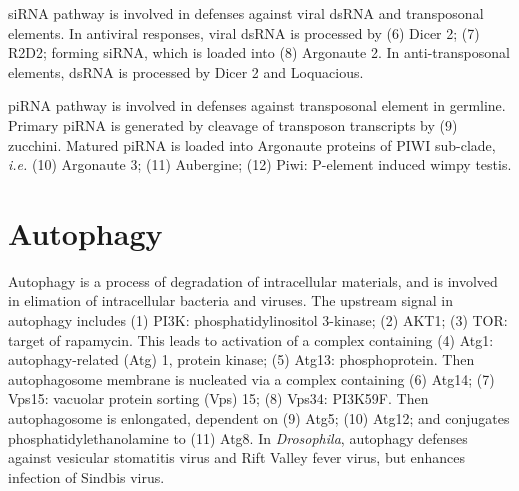 \documentclass[11pt]{article}
\begin{document}
\begin{sloppypar}
\par 

siRNA pathway is involved in defenses against viral dsRNA and transposonal elements. 
In antiviral responses, viral dsRNA is processed by 
\newline
(6) Dicer 2; \newline
(7) R2D2; \newline
forming siRNA, which is loaded into 
(8) Argonaute 2. 
In anti-transposonal elements, 
dsRNA is processed by Dicer 2 and Loquacious. 

\par

piRNA pathway is involved in defenses against transposonal element in germline. 
Primary piRNA is generated by cleavage of transposon transcripts by 
\newline
(9) zucchini. \newline
Matured piRNA is loaded into Argonaute proteins of PIWI sub-clade, \textit{i.e.} 
\newline
(10) Argonaute 3; \newline
(11) Aubergine; \newline
(12) Piwi: P-element induced wimpy testis. 

\section*{Autophagy}
Autophagy is a process of degradation of intracellular materials, and is involved in elimation of intracellular bacteria and viruses. 
The upstream signal in autophagy includes 
\newline
(1) PI3K: phosphatidylinositol 3-kinase; \newline
(2) AKT1; \newline
(3) TOR: target of rapamycin. \newline
This leads to activation of a complex containing 
\newline
(4) Atg1: autophagy-related (Atg) 1, protein kinase; \newline
(5) Atg13: phosphoprotein. 
\newline
Then autophagosome membrane is nucleated via a complex containing 
\newline
(6) Atg14; \newline
(7) Vps15: vacuolar protein sorting (Vps) 15; \newline
(8) Vps34: PI3K59F. \newline
Then autophagosome is enlongated, dependent on 
\newline
(9) Atg5; \newline
(10) Atg12; \newline
and conjugates phosphatidylethanolamine to 
\newline
(11) Atg8. \newline
In \textit{Drosophila}, autophagy defenses against vesicular stomatitis virus and Rift Valley fever virus, but enhances infection of Sindbis virus. 


\end{sloppypar}
\end{document}
